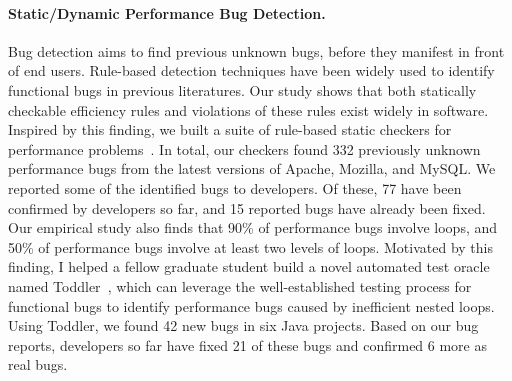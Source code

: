 \documentclass[10pt]{article}
\begin{document}
\paragraph{Static/Dynamic Performance Bug Detection.}
Bug detection aims to find previous unknown bugs,
before they manifest in front of end users. 
Rule-based detection techniques have been widely used to identify 
functional bugs in previous literatures.
Our study shows that both statically checkable efficiency rules 
and violations of these rules exist widely in software. 
Inspired by this finding,
we built a suite of rule-based static checkers for performance problems~\cite{jin12perfbug}.
In total, our checkers found 332 previously unknown performance bugs 
from the latest versions of Apache, Mozilla, and MySQL. 
We reported some of the identified bugs to developers. 
Of these, 77 have been confirmed by developers so far, 
and 15 reported bugs have already been fixed.
Our empirical study also finds that 90\% of performance bugs involve loops, 
and 50\% of performance bugs involve at least two levels of loops. 
Motivated by this finding, I helped a fellow graduate student 
build a novel automated test oracle named Toddler~\cite{Nistor13ICSE},
which can leverage the well-established testing process for functional bugs to 
identify performance bugs caused by inefficient nested loops. 
Using Toddler, we found 42 new bugs in six Java projects.
Based on our bug reports, developers so far have fixed 21 of these bugs 
and confirmed 6 more as real bugs. 

\vspace{-.1in}
\end{document}
